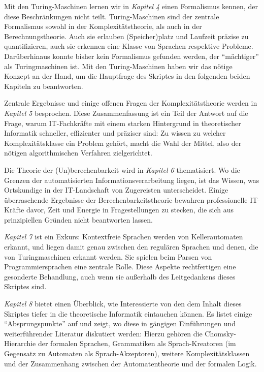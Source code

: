 Mit den Turing-Maschinen lernen wir in \emph{Kapitel 4} einen Formalismus kennen,
der diese Beschränkungen nicht teilt.
Turing-Maschinen sind der zentrale Formalismus sowohl
in der Komplexitätstheorie,
als auch in der Berechnungstheorie.
Auch sie erlauben (Speicher)platz und Laufzeit präzise zu quantifizieren,
auch sie erkennen eine Klasse von Sprachen respektive Probleme.
Darüberhinaus konnte bisher kein Formalismus gefunden werden,
der ``mächtiger'' als Turingmaschinen ist.
Mit den Turing-Maschinen haben wir das nötige Konzept an der Hand,
um die Hauptfrage des Skriptes in den folgenden beiden Kapiteln zu beantworten.

Zentrale Ergebnisse und einige offenen Fragen der Komplexitätstheorie
werden in \emph{Kapitel 5} besprochen.
Diese Zusammenfassung ist ein Teil der Antwort auf die Frage,
warum IT-Fachkräfte mit einem starken Hintergrund in theoretischer Informatik
schneller, effizienter und präziser sind:
Zu wissen zu welcher Komplexitätsklasse ein Problem gehört,
macht die Wahl der Mittel,
also der nötigen algorithmischen Verfahren zielgerichtet.

Die Theorie der (Un)berechenbarkeit wird in \emph{Kapitel 6} thematisiert.
Wo die Grenzen der automatisierten Informationsverarbeitung liegen,
ist das Wissen,
was Ortskundige in der IT-Landschaft von Zugereisten unterscheidet.
Einige überraschende Ergebnisse der Berechenbarkeitstheorie
bewahren professionelle IT-Kräfte davor,
Zeit und Energie in Fragestellungen zu stecken,
die sich aus prinzipiellen Gründen nicht beantworten lassen.

\emph{Kapitel 7} ist ein Exkurs: Kontextfreie Sprachen werden von Kellerautomaten erkannt,
und liegen damit genau zwischen den regulären Sprachen
und denen, die von Turingmaschinen erkannt werden.
Sie spielen beim Parsen von Programmiersprachen eine zentrale Rolle.
Diese Aspekte rechtfertigen eine gesonderte Behandlung,
auch wenn sie außerhalb des Leitgedankens dieses Skriptes sind.

\emph{Kapitel 8} bietet einen Überblick,
wie Interessierte von den dem Inhalt dieses Skriptes tiefer in die theoretische Informatik
eintauchen können.
Es listet einige ``Absprungspunkte'' auf und zeigt,
wo diese in gängigen Einführungen und weiterführender Literatur diskutiert werden:
Hierzu gehören die Chomsky-Hierarchie der formalen Sprachen,
Grammatiken als Sprach-Kreatoren (im Gegensatz zu Automaten als Sprach-Akzeptoren),
weitere Komplexitätsklassen und
der Zusammenhang zwischen der Automatentheorie und der formalen Logik.

